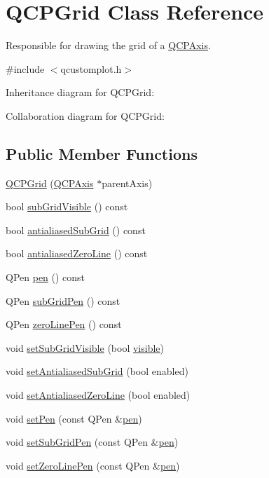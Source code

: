 \hypertarget{class_q_c_p_grid}{}\section{Q\+C\+P\+Grid Class Reference}
\label{class_q_c_p_grid}


Responsible for drawing the grid of a \hyperlink{class_q_c_p_axis}{Q\+C\+P\+Axis}.  




{\ttfamily \#include $<$qcustomplot.\+h$>$}



Inheritance diagram for Q\+C\+P\+Grid\+:


Collaboration diagram for Q\+C\+P\+Grid\+:
\subsection*{Public Member Functions}
\begin{DoxyCompactItemize}
\item 
\hyperlink{class_q_c_p_grid_acd1cdd2909625388a13048b698494a17}{Q\+C\+P\+Grid} (\hyperlink{class_q_c_p_axis}{Q\+C\+P\+Axis} $\ast$parent\+Axis)
\item 
bool \hyperlink{class_q_c_p_grid_afface6d8cb6df3cbdc0b5c7c2658f96a}{sub\+Grid\+Visible} () const
\item 
bool \hyperlink{class_q_c_p_grid_af16a269b15b2a8d904be087d060536bc}{antialiased\+Sub\+Grid} () const
\item 
bool \hyperlink{class_q_c_p_grid_a578d0bd4d2e5000a2ca69b9a034d59aa}{antialiased\+Zero\+Line} () const
\item 
Q\+Pen \hyperlink{class_q_c_p_grid_a1d68418766b3408c0b7b29ef40b04c2a}{pen} () const
\item 
Q\+Pen \hyperlink{class_q_c_p_grid_ae231e5b87e68689a666f90531a15552f}{sub\+Grid\+Pen} () const
\item 
Q\+Pen \hyperlink{class_q_c_p_grid_a85f248487110c4043be696aef5f2f6e1}{zero\+Line\+Pen} () const
\item 
void \hyperlink{class_q_c_p_grid_ad4ad6bf714ec45e08845456355a1b700}{set\+Sub\+Grid\+Visible} (bool \hyperlink{class_q_c_p_layerable_af0297b944b6192b6d67d00bff41b6b70}{visible})
\item 
void \hyperlink{class_q_c_p_grid_a5692310ba183721a413d60951407d114}{set\+Antialiased\+Sub\+Grid} (bool enabled)
\item 
void \hyperlink{class_q_c_p_grid_a3cc6d54647393ee71afb6da56af07aa4}{set\+Antialiased\+Zero\+Line} (bool enabled)
\item 
void \hyperlink{class_q_c_p_grid_aa05ab9816ffb440908171e45e833b593}{set\+Pen} (const Q\+Pen \&\hyperlink{class_q_c_p_grid_a1d68418766b3408c0b7b29ef40b04c2a}{pen})
\item 
void \hyperlink{class_q_c_p_grid_a9edd3593f384d1f0b0202a39cef4453d}{set\+Sub\+Grid\+Pen} (const Q\+Pen \&\hyperlink{class_q_c_p_grid_a1d68418766b3408c0b7b29ef40b04c2a}{pen})
\item 
void \hyperlink{class_q_c_p_grid_a209f40fdb252397b418b82d3494d8ea0}{set\+Zero\+Line\+Pen} (const Q\+Pen \&\hyperlink{class_q_c_p_grid_a1d68418766b3408c0b7b29ef40b04c2a}{pen})
\end{DoxyCompactItemize}
